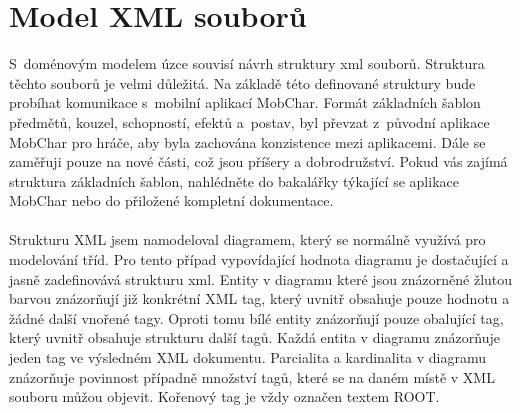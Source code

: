 \documentclass[thesis=B,czech]{resources/FITthesis}[2012/06/26]
\begin{document}
	\section{Model XML souborů}
S~doménovým modelem úzce souvisí návrh struktury xml souborů. Struktura těchto souborů je velmi důležitá. Na základě této definované struktury bude probíhat komunikace s~mobilní aplikací MobChar. Formát základních šablon předmětů, kouzel, schopností, efektů a~postav, byl převzat z~původní aplikace MobChar pro hráče, aby byla zachována konzistence mezi aplikacemi. Dále se zaměřuji pouze na nové části, což jsou příšery a dobrodružství. Pokud vás zajímá struktura základních šablon, nahlédněte do bakalářky týkající se aplikace MobChar\cite{Weberova_2017} nebo do přiložené kompletní dokumentace.\\
\\
Strukturu XML jsem namodeloval diagramem, který se normálně využívá pro modelování tříd. Pro tento případ vypovídající hodnota diagramu je dostačující a jasně zadefinovává strukturu xml. Entity v diagramu které jsou znázorněné žlutou barvou znázorňují již konkrétní XML tag, který uvnitř obsahuje pouze hodnotu a žádné další vnořené tagy. Oproti tomu bílé entity znázorňují pouze obalující tag, který uvnitř obsahuje strukturu další tagů. Každá entita v diagramu znázorňuje jeden tag ve výsledném XML dokumentu. Parcialita a kardinalita v diagramu znázorňuje povinnost případně množství tagů, které se na daném místě v XML souboru můžou objevit. Kořenový tag je vždy označen textem  \clqq ROOT\crqq .
\end{document}
